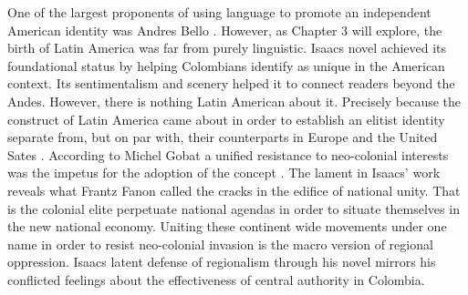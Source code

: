 \documentclass[12pt]{report}
\begin{document}
One of the largest proponents of using language to promote an independent American identity was Andres Bello \autocite[1350]{Gobat2013}. However, as Chapter 3 will explore, the birth of Latin America was far from purely linguistic. Isaacs novel achieved its foundational status by helping Colombians identify as unique in the American context.  Its sentimentalism and scenery helped it to connect readers beyond the Andes. However, there is nothing Latin American about it. Precisely because the construct of Latin America came about in order to establish an elitist identity separate from, but on par with, their counterparts in Europe and the United Sates \autocite[1349]{Gobat2013}. According to Michel Gobat a unified resistance to neo-colonial interests was the impetus for the adoption of the concept \autocite[1349]{Gobat2013}. The lament in Isaacs' work reveals what Frantz Fanon called the cracks in the edifice of national unity. That is the colonial elite perpetuate national agendas in order to situate themselves in the new national economy. Uniting these continent wide movements under one name in order to resist neo-colonial invasion is the macro version of regional oppression. Isaacs latent defense of regionalism through his novel mirrors his conflicted feelings about the effectiveness of central authority in Colombia. 


\end{document}
